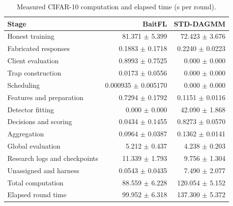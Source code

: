 \begin{table}[t]\centering\footnotesize\setlength{\tabcolsep}{8pt}
\caption{Measured CIFAR-10 computation and elapsed time (s per round).}\label{tab:std-segments-cifar10}
\begin{tabular}{lrr}\toprule Stage & BaitFL & STD-DAGMM \\ \midrule
Honest training & 81.371 $\pm$ 5.399 & 72.423 $\pm$ 3.676 \\
Fabricated responses & 0.1883 $\pm$ 0.1718 & 0.2240 $\pm$ 0.0223 \\
Client evaluation & 0.8993 $\pm$ 0.7525 & 0.000 $\pm$ 0.000 \\
Trap construction & 0.0173 $\pm$ 0.0556 & 0.000 $\pm$ 0.000 \\
Scheduling & 0.000935 $\pm$ 0.005170 & 0.000 $\pm$ 0.000 \\
Features and preparation & 0.7294 $\pm$ 0.1792 & 0.1151 $\pm$ 0.0116 \\
Detector fitting & 0.000 $\pm$ 0.000 & 42.090 $\pm$ 1.868 \\
Decisions and scoring & 0.0434 $\pm$ 0.1455 & 0.8273 $\pm$ 0.0570 \\
Aggregation & 0.0964 $\pm$ 0.0387 & 0.1362 $\pm$ 0.0141 \\
Global evaluation & 5.212 $\pm$ 0.437 & 4.238 $\pm$ 0.203 \\
\midrule
Research logs and checkpoints & 11.339 $\pm$ 1.793 & 9.756 $\pm$ 1.304 \\
Unassigned and harness & 0.0543 $\pm$ 0.0435 & 7.490 $\pm$ 2.077 \\
\midrule
Total computation & 88.559 $\pm$ 6.228 & 120.054 $\pm$ 5.152 \\
Elapsed round time & 99.952 $\pm$ 6.318 & 137.300 $\pm$ 5.372 \\
\bottomrule\end{tabular}\end{table}
